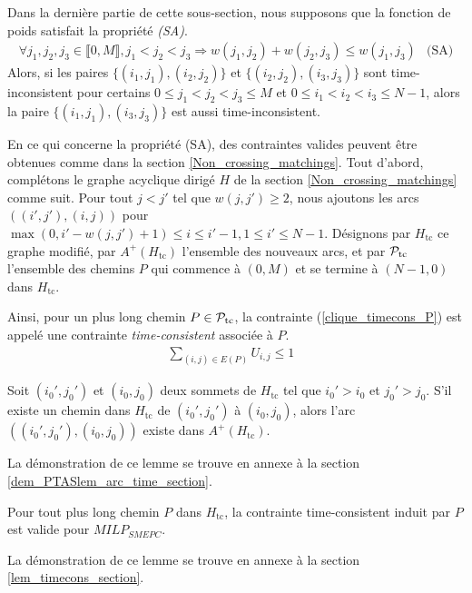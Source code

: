 {{Dans la dernière partie de cette sous-section, nous supposons que la fonction de poids satisfait la propriété \emph{(SA)}.
$$ \begin{array}{lr}
\forall j_1, j_2, j_3 \in \llbracket 0, M \rrbracket, j_1 < j_2 < j_3 \Rightarrow w(j_1, j_2) + w(j_2, j_3) \leq w(j_1, j_3) & \textrm{(SA)}
\end{array} $$ 
%
Alors, si les paires $\{(i_1, j_1), (i_2, j_2) \}$ et  $\{(i_2, j_2), (i_3, j_3) \}$ sont time-inconsistent
pour certains $ 0\leq j_1 < j_2< j_3 \leq M$ et $ 0\leq i_1 < i_2 < i_3 \leq N-1$, alors 
la paire $\{(i_1, j_1), (i_3, j_3) \}$ est aussi time-inconsistent.

En ce qui concerne la propriété (SA), des contraintes valides peuvent être obtenues comme dans la section \ref{Non_crossing_matchings}.
Tout d'abord, complétons le graphe acyclique dirigé $H$ de la section \ref{Non_crossing_matchings} comme suit.
Pour tout $j < j'$ tel que $w(j, j') \geq 2$, nous ajoutons les arcs $((i' ,j'), (i,j))$ pour $ \max(0, i' - w(j, j') +1) \leq i \leq i'-1, 1 \leq i' \leq N-1$.
Désignons par $H_\textrm{tc}$ ce graphe modifié, par $A^+(H_\textrm{tc})$ l'ensemble des nouveaux arcs, et par ${\cal P}_\textrm{tc}$ l'ensemble des chemins $P$ qui commence à $(0, M)$ et se termine à $(N-1, 0)$ dans $H_\textrm{tc}$.

Ainsi, pour un plus long chemin $P \in {\cal P}_\textrm{tc}$, la contrainte (\ref{clique_timecons_P}) est appelé une contrainte {\it time-consistent} associée à $P$. 
\begin{eqnarray}
\sum_{(i, j) \in E(P)} U_{i,j} \le 1 &\label{clique_timecons_P}
\end{eqnarray}

\begin{Lem}\label{lem_arc_time}
	Soit $(i_0', j_0') $  et $(i_0, j_0) $ deux sommets de $H_\textrm{tc}$ tel que	$i_0' > i_0 $ et $j_0' > j_0 $. S'il existe un chemin dans $H_\textrm{tc}$ de $(i_0', j_0') $ à $(i_0, j_0) $, alors l'arc $((i_0', j_0'), (i_0, j_0)) $ existe dans $A^+(H_\textrm{tc})$.
\end{Lem}
La démonstration de ce lemme se trouve en annexe à la section \ref{dem_PTASlem_arc_time_section}.

\begin{Lem}\label{lem_timecons}
	Pour tout plus long chemin $P$ dans $H_\textrm{tc}$, la contrainte time-consistent induit par $P$ est valide pour $MILP_{SMEPC}$.
\end{Lem}
La démonstration de ce lemme se trouve en annexe à la section \ref{lem_timecons_section}.

}}
